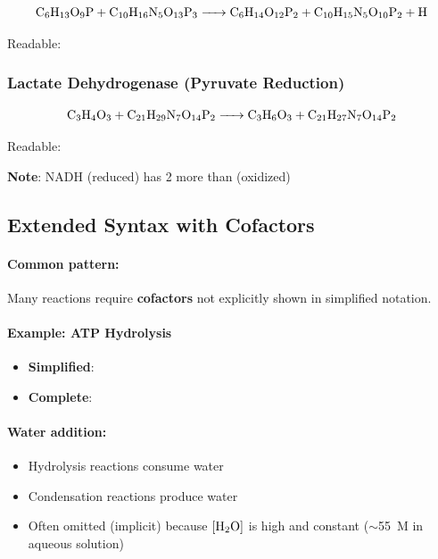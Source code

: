\begin{equation}
\ce{C6H13O9P + C10H16N5O13P3 -> C6H14O12P2 + C10H15N5O10P2 + H}
\end{equation}

\noindent Readable: 

\subsubsection{Lactate Dehydrogenase (Pyruvate Reduction)}

\begin{equation}
\ce{C3H4O3 + C21H29N7O14P2 -> C3H6O3 + C21H27N7O14P2}
\end{equation}

\noindent Readable: 

\noindent\textbf{Note}: NADH (reduced) has 2 more  than  (oxidized)

\subsection{Extended Syntax with Cofactors}
\label{subsec:cofactor-syntax}

\paragraph{Common pattern:} Many reactions require \textbf{cofactors} not explicitly shown in simplified notation.

\paragraph{Example: ATP Hydrolysis}
\begin{itemize}
    \item \textbf{Simplified}: 
    \item \textbf{Complete}: 
\end{itemize}

\paragraph{Water addition:}
\begin{itemize}
    \item Hydrolysis reactions consume water
    \item Condensation reactions produce water
    \item Often omitted (implicit) because $[\ce{H2O}]$ is high and constant ($\sim$55~M in aqueous solution)
\end{itemize}

